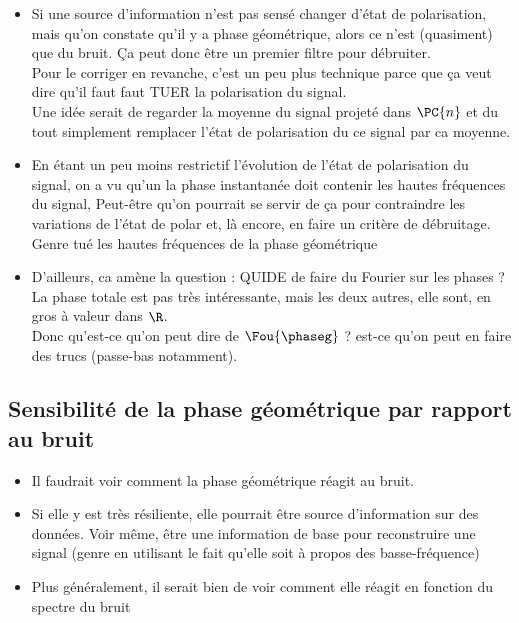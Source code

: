 \begin{itemize}
	\item Si une source d'information n'est pas sensé changer d'état de polarisation, mais qu'on constate qu'il y a phase géométrique, alors ce n'est (quasiment) que du bruit. Ça peut donc être un premier filtre pour débruiter.
	\\
	
	Pour le corriger en revanche, c'est un peu plus technique parce que ça veut dire qu'il faut faut TUER la polarisation du signal.
	\\
	Une idée serait de regarder la moyenne du signal projeté dans $\PC{n}$ et du tout simplement remplacer l'état de polarisation du ce signal par ca moyenne.
	
	\item En étant un peu moins restrictif l'évolution de l'état de polarisation du signal, on a vu qu'un la phase instantanée doit contenir les hautes fréquences du signal, Peut-être qu'on pourrait se servir de ça pour contraindre les variations de l'état de polar et, là encore, en faire un critère de débruitage. Genre tué les hautes fréquences de la phase géométrique
	
	\item D'ailleurs, ca amène la question : QUIDE de faire du Fourier sur les phases ? La phase totale est pas très intéressante, mais les deux autres, elle sont, en gros à valeur dans $\R$.\\
	Donc qu'est-ce qu'on peut dire de $\Fou{\phaseg}$ ? est-ce qu'on peut en faire des trucs (passe-bas notamment).
	
\end{itemize}




\subsection{Sensibilité de la phase géométrique par rapport au bruit}

\begin{itemize}
	\item Il faudrait voir comment la phase géométrique réagit au bruit.
	
	\item Si elle y est très résiliente, elle pourrait être source d'information sur des données. Voir même, être une information de base pour reconstruire une signal (genre en utilisant le fait qu'elle soit à propos des basse-fréquence)
	
	\item Plus généralement, il serait bien de voir comment elle réagit en fonction du spectre du bruit
	
\end{itemize}



